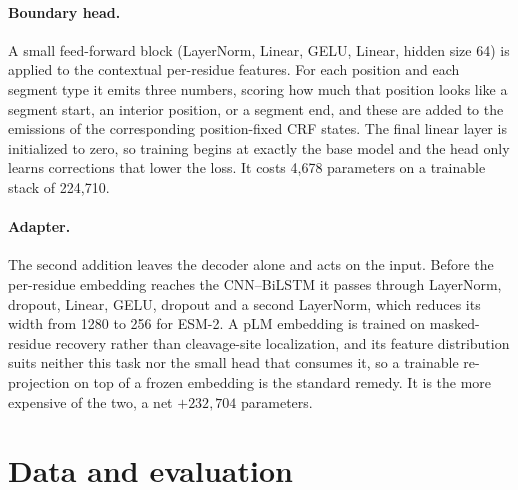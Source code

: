 \documentclass{article}
\begin{document}
\paragraph{Boundary head.} A small feed-forward block (LayerNorm, Linear, GELU, Linear, hidden size 64) is applied to the contextual per-residue features. For each position and each segment type it emits three numbers, scoring how much that position looks like a segment start, an interior position, or a segment end, and these are added to the emissions of the corresponding position-fixed CRF states. The final linear layer is initialized to zero, so training begins at exactly the base model and the head only learns corrections that lower the loss. It costs 4{,}678 parameters on a trainable stack of 224{,}710.

\paragraph{Adapter.} The second addition leaves the decoder alone and acts on the input. Before the per-residue embedding reaches the CNN--BiLSTM it passes through LayerNorm, dropout, Linear, GELU, dropout and a second LayerNorm, which reduces its width from 1280 to 256 for ESM-2. A pLM embedding is trained on masked-residue recovery rather than cleavage-site localization, and its feature distribution suits neither this task nor the small head that consumes it, so a trainable re-projection on top of a frozen embedding is the standard remedy. It is the more expensive of the two, a net $+232{,}704$ parameters.


\section{Data and evaluation}
\label{sec:eval}
\end{document}
